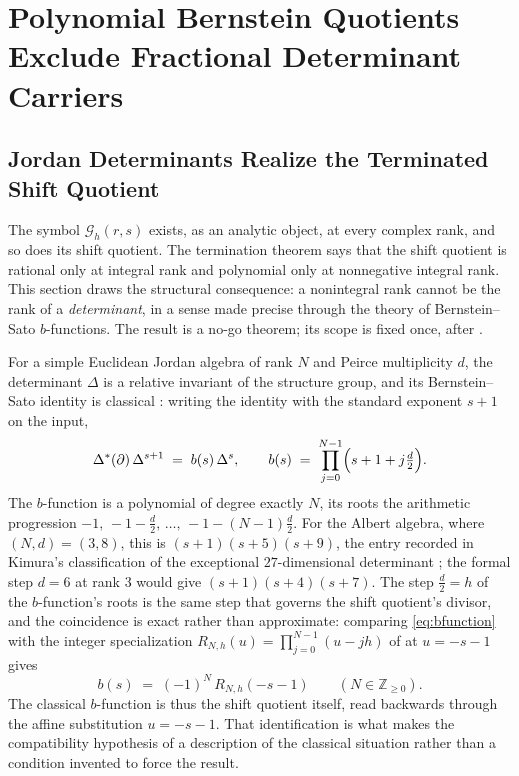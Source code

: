 \documentclass[11pt,letterpaper]{article}
\newcommand{\Gc}{\mathcal{G}}               %
\newcommand{\Zint}{\mathbb{Z}}
\newcommand{\Rm}{R}                          %
\begin{document}
\section{Polynomial Bernstein Quotients Exclude Fractional Determinant Carriers}
\label{sec:bernstein}

\subsection{Jordan Determinants Realize the Terminated Shift Quotient}
\label{sec:bfunction}

The symbol $\Gc_h(r,s)$ exists, as an analytic object, at every complex rank,
and so does its shift quotient. The termination theorem says that the shift
quotient is rational only at integral rank and polynomial only at nonnegative
integral rank. This section draws the structural consequence: a nonintegral rank
cannot be the rank of a \emph{determinant}, in a sense made precise through the
theory of Bernstein--Sato $b$-functions. The result is a no-go theorem; its
scope is fixed once, after .

For a simple Euclidean Jordan algebra of rank $N$ and Peirce multiplicity $d$,
the determinant $\Delta$ is a relative invariant of the structure group, and its
Bernstein--Sato identity is classical \cite[Prop.~VII.1.4]{FK}: writing the
identity with the standard exponent $s+1$ on the input,
\begin{equation}
  \Delta^{*}(\partial)\,\Delta^{s+1}\;=\;b(s)\,\Delta^{s},
  \qquad
  b(s)\;=\;\prod_{j=0}^{N-1}\Bigl(s+1+j\tfrac{d}{2}\Bigr).
  \label{eq:bfunction}
\end{equation}
The $b$-function is a polynomial of degree exactly $N$, its roots the arithmetic
progression $-1,\,-1-\tfrac{d}{2},\,\dots,\,-1-(N-1)\tfrac{d}{2}$. For the Albert
algebra, where $(N,d)=(3,8)$, this is $(s+1)(s+5)(s+9)$, the entry recorded in
Kimura's classification of the exceptional $27$-dimensional determinant
\cite[Prop.~2.22, entry (27)]{Kimura}; the formal step $d=6$ at rank $3$ would
give $(s+1)(s+4)(s+7)$. The step $\tfrac{d}{2}=h$ of the $b$-function's roots is the
same step that governs the shift quotient's divisor, and the coincidence is exact
rather than approximate: comparing \eqref{eq:bfunction} with the integer
specialization $\Rm_{N,h}(u)=\prod_{j=0}^{N-1}(u-jh)$ of  at
$u=-s-1$ gives
\begin{equation}
  b(s)\;=\;(-1)^{N}\,\Rm_{N,h}(-s-1)
  \qquad (N\in\Zint_{\ge0}).
  \label{eq:b-is-shift}
\end{equation}
The classical $b$-function is thus the shift quotient itself, read backwards
through the affine substitution $u=-s-1$. That identification is what makes the
compatibility hypothesis of  a description of the classical
situation rather than a condition invented to force the result.
\end{document}
